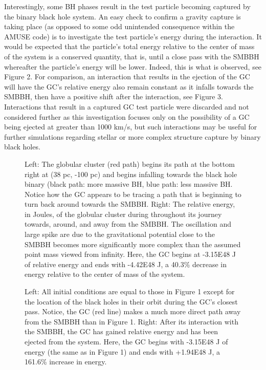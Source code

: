 \documentclass{aastex62}
\begin{document}
Interestingly, some BH phases result in the test particle becoming captured by the binary black hole system. An easy check to confirm a gravity capture is taking place (as opposed to some odd unintended consequence within the AMUSE code) is to investigate the test particle's energy during the interaction. It would be expected that the particle's total energy relative to the center of mass of the system is a conserved quantity, that is, until a close pass with the SMBBH whereafter the particle's energy will be lower. Indeed, this is what is observed, see Figure 2. For comparison, an interaction that results in the ejection of the GC will have the GC's relative energy also remain constant as it infalls towards the SMBBH, then have a positive shift after the interaction, see Figure 3. Interactions that result in a captured GC test particle were discarded and not considered further as this investigation focuses only on the possibility of a GC being ejected at greater than 1000 km/s, but such interactions may be useful for further simulations regarding stellar or more complex structure capture by binary black holes.
\begin{figure}
\caption{Left: The globular cluster (red path) begins its path at the bottom right at (38 pc, -100 pc) and begins infalling towards the black hole binary (black path: more massive BH, blue path: less massive BH. Notice how the GC appears to be tracing a path that is beginning to turn back around towards the SMBBH. Right: The relative energy, in Joules, of the globular cluster during throughout its journey towards, around, and away from the SMBBH. The oscillation and large spike are due to the gravitational potential close to the SMBBH becomes more significantly more complex than the assumed point mass viewed from infinity. Here, the GC begins at -3.15E48 J of relative energy and ends with -4.42E48 J, a 40.3\% decrease in energy relative to the center of mass of the system.}
\end{figure}
\begin{figure}
\caption{Left: All initial conditions are equal to those in Figure 1 except for the location of the black holes in their orbit during the GC's closest pass. Notice, the GC (red line) makes a much more direct path away from the SMBBH than in Figure 1. Right: After its interaction with the SMBBH, the GC has gained relative energy and has been ejected from the system. Here, the GC begins with -3.15E48 J of energy (the same as in Figure 1) and ends with +1.94E48 J, a 161.6\% increase in energy.}
\end{figure}
\end{document}
